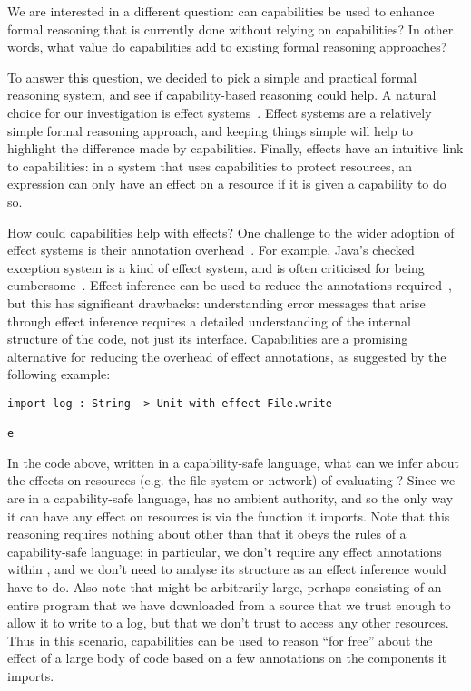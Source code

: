 We are interested in a different question: can capabilities be used to enhance formal reasoning that is currently done without relying on capabilities?
In other words, what value do capabilities add to existing formal reasoning approaches?

To answer this question, we decided to pick a simple and practical formal reasoning system, and see if capability-based reasoning could help.
A natural choice for our investigation is effect systems~\cite{nielson99}.
Effect systems are a relatively simple formal reasoning approach, and keeping things simple will help to highlight the difference made by capabilities.
Finally, effects have an intuitive link to capabilities: in a system that uses capabilities to protect resources, an expression can only have an effect on a resource if it is given a capability to do so.

How could capabilities help with effects?
One challenge to the wider adoption of effect systems is their annotation overhead~\cite{rytz12}.
For example, Java's checked exception system is a kind of effect system, and is often criticised for being cumbersome~\cite{Kiniry2006}.
Effect inference can be used to reduce the annotations required~\cite{koka14}, but this has significant drawbacks: understanding error messages that arise through effect inference requires a detailed understanding of the internal structure of the code, not just its interface.
Capabilities are a promising alternative for reducing the overhead of effect annotations, as suggested by the following example:

\begin{lstlisting}
import log : String -> Unit with effect File.write

e
\end{lstlisting}

In the code above, written in a capability-safe language, what can we infer about the effects on resources (e.g. the file system or network) of evaluating ?
Since we are in a capability-safe language,  has no ambient authority, and so the only way it can have any effect on resources is via the  function it imports.
Note that this reasoning requires nothing about  other than that it obeys the rules of a capability-safe language; in particular, we don't require any effect annotations within , and we don't need to analyse its structure as an effect inference would have to do.
Also note that  might be arbitrarily large, perhaps consisting of an entire program that we have downloaded from a source that we trust enough to allow it to write to a log, but that we don't trust to access any other resources.
Thus in this scenario, capabilities can be used to reason ``for free'' about the effect of a large body of code based on a few annotations on the components it imports.

